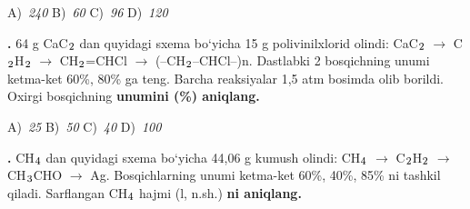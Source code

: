 \documentclass[11pt,a4paper]{article}
\renewcommand{\textsubscript}[1]{\ensuremath{_{\text{\fontsize{8}{8}\selectfont #1}}}}
\newcommand{\qn}[1]{\textbf{\fontsize{11.5}{13}\selectfont #1}}
\newcommand{\qsep}{\par\vspace{13pt}}
\begin{document}
\begin{multicols}{2}
\noindent A)~\textsl{240} \hfill B)~\textsl{60} \hfill C)~\textsl{96} \hfill D)~\textsl{120}\par
\qsep
\noindent\qn{28.} 64 g CaC\textsubscript{2} dan quyidagi sxema bo`yicha 15 g polivinilxlorid olindi: CaC\textsubscript{2} $\to$ C\textsubscript{2}H\textsubscript{2} $\to$ CH\textsubscript{2}=CHCl $\to$ (--CH\textsubscript{2}--CHCl--)n. Dastlabki 2 bosqichning unumi ketma-ket 60\%, 80\% ga teng. Barcha reaksiyalar 1,5 atm bosimda olib borildi. Oxirgi bosqichning \textbf{unumini (\%) aniqlang.}

\noindent A)~\textsl{25} \hfill B)~\textsl{50} \hfill C)~\textsl{40} \hfill D)~\textsl{100}\par
\qsep
\noindent\qn{29.} CH\textsubscript{4} dan quyidagi sxema bo`yicha 44,06 g kumush olindi: CH\textsubscript{4} $\to$ C\textsubscript{2}H\textsubscript{2} $\to$ CH\textsubscript{3}CHO $\to$ Ag. Bosqichlarning unumi ketma-ket 60\%, 40\%, 85\% ni tashkil qiladi. Sarflangan CH\textsubscript{4} hajmi (l, n.sh.) \textbf{ni aniqlang.}


\end{multicols}
\end{document}
